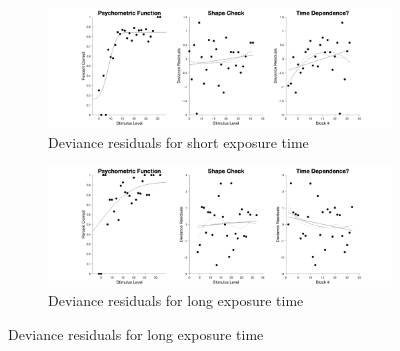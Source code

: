 \documentclass{article}
\begin{document}
\begin{figure}[!hb]
    \begin{subfigure}{\textwidth}
        \centering
        \includegraphics[width = \linewidth]{Thesis/plots/gof/segSize/segSize_da_short_deviance.png}
        \caption{Deviance residuals for short exposure time}
    \end{subfigure}
    \begin{subfigure}{\textwidth}
        \centering
        \includegraphics[width = \linewidth]{Thesis/plots/gof/segSize/segSize_da_long_deviance.png}
        \caption{Deviance residuals for long exposure time}
    \end{subfigure}
\end{figure}

\clearpage
\end{document}
